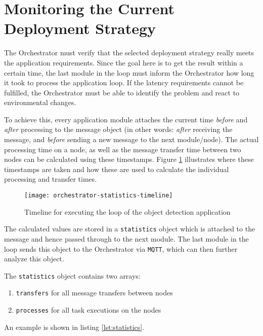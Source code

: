 \section{Monitoring the Current Deployment Strategy\label{sec:orchestrator-monitoring-deployment-strategy}}

The Orchestrator must verify that the selected deployment strategy really meets the application requirements.
Since the goal here is to get the result within a certain time, the last module in the loop must inform the Orchestrator how long it took to process the application loop.
If the latency requirements cannot be fulfilled, the Orchestrator must be able to identify the problem and react to environmental changes.

To achieve this, every application module attaches the current time \textit{before} and \textit{after} processing to the message object (in other words: \textit{after} receiving the message, and \textit{before} sending a new message to the next module/node).
The actual processing time on a node, as well as the message transfer time between two nodes can be calculated using these timestamps.
Figure \ref{fig:orchestrator-statistics-timeline} illustrates where these timestamps are taken and how these are used to calculate the individual processing and transfer times.

\begin{figure}[h]
    \centering
    \texttt{[image: orchestrator-statistics-timeline]}
    \caption{Timeline for executing the loop of the object detection application}
    \label{fig:orchestrator-statistics-timeline}
\end{figure}

The calculated values are stored in a \texttt{statistics} object which is attached to the message and hence passed through to the next module.
The last module in the loop sends this object to the Orchestrator via \texttt{MQTT}, which can then further analyze this object.

The \texttt{statistics} object contains two arrays:
\begin{enumerate}
    \item \texttt{transfers} for all message transfers between nodes
    \item \texttt{processes} for all task executions on the nodes
\end{enumerate}

An example is shown in listing \ref{lst:statistics}.

\clearpage



